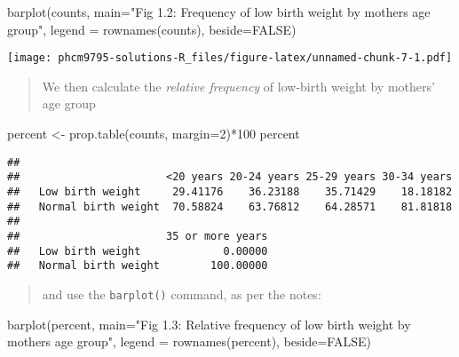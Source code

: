 \documentclass[
]{memoir}
\newenvironment{Shaded}{\begin{snugshade}}{\end{snugshade}}
\newcommand{\AttributeTok}[1]{\textcolor[rgb]{0.77,0.63,0.00}{#1}}
\newcommand{\ConstantTok}[1]{\textcolor[rgb]{0.00,0.00,0.00}{#1}}
\newcommand{\DecValTok}[1]{\textcolor[rgb]{0.00,0.00,0.81}{#1}}
\newcommand{\FunctionTok}[1]{\textcolor[rgb]{0.00,0.00,0.00}{#1}}
\newcommand{\NormalTok}[1]{#1}
\newcommand{\OtherTok}[1]{\textcolor[rgb]{0.56,0.35,0.01}{#1}}
\newcommand{\SpecialCharTok}[1]{\textcolor[rgb]{0.00,0.00,0.00}{#1}}
\newcommand{\StringTok}[1]{\textcolor[rgb]{0.31,0.60,0.02}{#1}}
\begin{document}
\begin{Shaded}
\begin{Highlighting}[]
\FunctionTok{barplot}\NormalTok{(counts, }
        \AttributeTok{main=}\StringTok{"Fig 1.2: Frequency of low birth weight by mother\textquotesingle{}s age group"}\NormalTok{,}
        \AttributeTok{legend =} \FunctionTok{rownames}\NormalTok{(counts), }\AttributeTok{beside=}\ConstantTok{FALSE}\NormalTok{)}
\end{Highlighting}
\end{Shaded}

\texttt{[image: phcm9795-solutions-R\_files/figure-latex/unnamed-chunk-7-1.pdf]}

\begin{quote}
We then calculate the \emph{relative frequency} of low-birth weight by mothers' age group
\end{quote}

\begin{Shaded}
\begin{Highlighting}[]
\NormalTok{percent }\OtherTok{\textless{}{-}} \FunctionTok{prop.table}\NormalTok{(counts, }\AttributeTok{margin=}\DecValTok{2}\NormalTok{)}\SpecialCharTok{*}\DecValTok{100}
\NormalTok{percent}
\end{Highlighting}
\end{Shaded}

\begin{verbatim}
##                      
##                       <20 years 20-24 years 25-29 years 30-34 years
##   Low birth weight     29.41176    36.23188    35.71429    18.18182
##   Normal birth weight  70.58824    63.76812    64.28571    81.81818
##                      
##                       35 or more years
##   Low birth weight             0.00000
##   Normal birth weight        100.00000
\end{verbatim}

\begin{quote}
and use the \texttt{barplot()} command, as per the notes:
\end{quote}

\begin{Shaded}
\begin{Highlighting}[]
\FunctionTok{barplot}\NormalTok{(percent, }
        \AttributeTok{main=}\StringTok{"Fig 1.3: Relative frequency of low birth weight by mother\textquotesingle{}s age group"}\NormalTok{,}
        \AttributeTok{legend =} \FunctionTok{rownames}\NormalTok{(percent), }\AttributeTok{beside=}\ConstantTok{FALSE}\NormalTok{)}
\end{Highlighting}
\end{Shaded}
\end{document}

